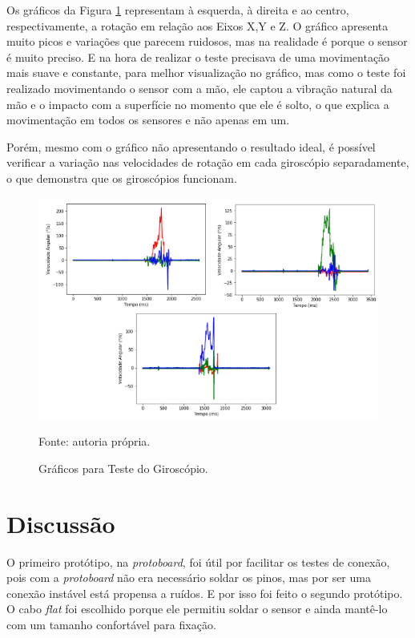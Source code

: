 	Os gráficos da Figura \ref{teste_giro} representam à esquerda, à direita e ao centro, respectivamente, a rotação em relação aos Eixos X,Y e Z. O gráfico apresenta muito picos e variações que parecem ruidosos, mas na realidade é porque o sensor é muito preciso. E na hora de realizar o teste precisava de uma movimentação mais suave e constante, para melhor visualização no gráfico, mas como o teste foi realizado movimentando o sensor com a mão, ele captou a vibração natural da mão e o impacto com a superfície no momento que ele é solto, o que explica a movimentação em todos os sensores e não apenas em um.
	
	Porém, mesmo com o gráfico não apresentando o resultado ideal, é possível verificar a variação nas velocidades de rotação em cada giroscópio separadamente, o que demonstra que os giroscópios funcionam. 
	
	\begin{figure}[h]
		\centering
		\includegraphics[keepaspectratio=true,scale=0.6]{figuras/teste_giro.png}
		\caption{Gráficos para Teste do Giroscópio.}
		\footnotesize Fonte: autoria própria. 
		\label{teste_giro}	
		
	\end{figure}
	
	\section{Discussão}		

	O primeiro protótipo, na \textit{protoboard}, foi útil por facilitar os testes de conexão, pois com a \textit{protoboard} não era necessário soldar os pinos, mas por ser uma conexão instável está propensa a ruídos. E por isso foi feito o segundo protótipo. O cabo \textit{flat} foi escolhido porque ele permitiu soldar o sensor e ainda mantê-lo com um tamanho confortável para fixação.
	
